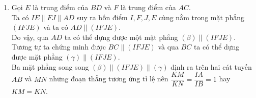 \begin{bt}
\begin{bt}
{\begin{enumerate}
			\item Gọi $E$ là trung điểm của $BD$ và $F$ là trung điểm của $AC$. \\
			Ta có $IE\parallel FJ\parallel AD$ suy ra bốn điểm $I,F,J,E$ cùng nằm trong mặt phẳng $(IFJE)$ và ta có $AD\parallel (IFJE)$. \\
			Do vậy, qua $AD$ ta có thể dựng được một mặt phẳng $\left(\beta \right)\parallel (IFJE)$. Tương tự ta chứng minh được $BC\parallel (IFJE)$ và qua $BC$ ta có thể dựng được mặt phẳng $\left(\gamma \right)\parallel (IFJE)$. \\
			Ba mặt phẳng song song $\left(\beta \right)\parallel (IFJE)\parallel \left(\gamma \right)$ định ra trên hai cát tuyến $AB$ và $MN$ những đoạn thẳng tương ứng tỉ lệ nên $\dfrac{KM}{KN}=\dfrac{IA}{IB}=1$ hay $KM=KN$.
		\end{enumerate}
	}
\end{bt}


\end{bt}

